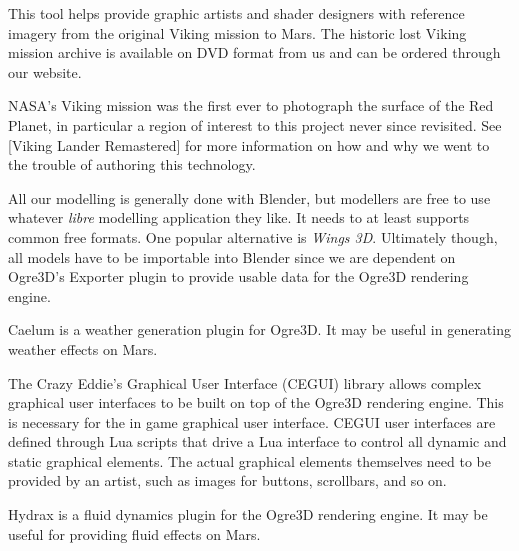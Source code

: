 

\startitemize[4]


This tool helps provide graphic artists and shader designers with reference imagery from the original Viking mission to Mars. The historic lost Viking mission archive is available on DVD format from us and can be ordered through our website. 

NASA's Viking mission was the first ever to photograph the surface of the Red Planet, in particular a region of interest to this project never since revisited. See [Viking Lander Remastered] for more information on how and why we went to the trouble of authoring this technology.


All our modelling is generally done with Blender, but modellers are free to use whatever {\it libre} modelling application they like. It needs to at least supports common free formats. One popular alternative is {\it Wings 3D}. Ultimately though, all models have to be importable into Blender since we are dependent on Ogre3D's Exporter plugin to provide usable data for the Ogre3D rendering engine.


Caelum is a weather generation plugin for Ogre3D. It may be useful in generating weather effects on Mars.


The Crazy Eddie's Graphical User Interface (CEGUI) library allows complex graphical user interfaces to be built on top of the Ogre3D rendering engine. This is necessary for the in game graphical user interface. CEGUI user interfaces are defined through Lua scripts that drive a Lua interface to control all dynamic and static graphical elements. The actual graphical elements themselves need to be provided by an artist, such as images for buttons, scrollbars, and so on.


Hydrax is a fluid dynamics plugin for the Ogre3D rendering engine. It may be useful for providing fluid effects on Mars.

